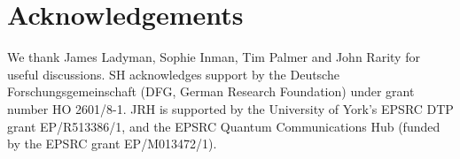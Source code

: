 \documentclass[superscriptaddress,twocolumn,floatfix,nofootinbib]{revtex4-2}
\begin{document}
\section{Acknowledgements}
We thank James Ladyman, Sophie Inman, Tim Palmer and John Rarity for useful discussions. 
SH acknowledges support by the Deutsche Forschungsgemeinschaft (DFG, German Research Foundation) under grant number HO 2601/8-1. JRH is supported by the University of York's EPSRC DTP grant EP/R513386/1, and the EPSRC Quantum Communications Hub (funded by the EPSRC grant EP/M013472/1).



\end{document}
